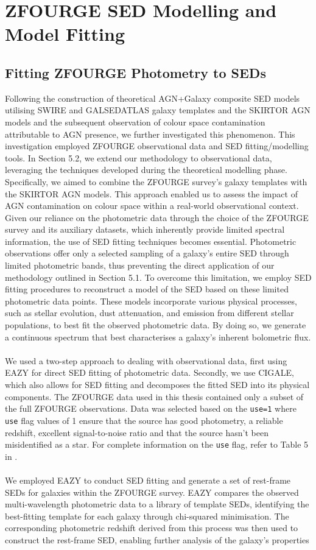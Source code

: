 \section{ZFOURGE SED Modelling and Model Fitting}
\subsection{Fitting ZFOURGE Photometry to SEDs}
Following the construction of theoretical AGN+Galaxy composite SED models utilising SWIRE and GALSEDATLAS galaxy templates and the SKIRTOR AGN models and the subsequent observation of colour space contamination attributable to AGN presence, we further investigated this phenomenon. This investigation employed ZFOURGE observational data and SED fitting/modelling tools. In Section 5.2, we extend our methodology to observational data, leveraging the techniques developed during the theoretical modelling phase. Specifically, we aimed to combine the ZFOURGE survey's galaxy templates with the SKIRTOR AGN models. This approach enabled us to assess the impact of AGN contamination on colour space within a real-world observational context. Given our reliance on the photometric data through the choice of the ZFOURGE survey and its auxiliary datasets, which inherently provide limited spectral information, the use of SED fitting techniques becomes essential.  Photometric observations offer only a selected sampling of a galaxy's entire SED through limited photometric bands, thus preventing the direct application of our methodology outlined in Section 5.1. To overcome this limitation, we employ SED fitting procedures to reconstruct a model of the SED based on these limited photometric data points. These models incorporate various physical processes, such as stellar evolution, dust attenuation, and emission from different stellar populations, to best fit the observed photometric data. By doing so, we generate a continuous spectrum that best characterises a galaxy's inherent bolometric flux.\\\\
We used a two-step approach to dealing with observational data, first using EAZY for direct SED fitting of photometric data. Secondly, we use CIGALE, which also allows for SED fitting and decomposes the fitted SED into its physical components. The ZFOURGE data used in this thesis contained only a subset of the full ZFOURGE observations. Data was selected based on the \texttt{use=1} where \texttt{use} flag values of 1 ensure that the source has good photometry, a reliable redshift, excellent signal-to-noise ratio and that the source hasn't been misidentified as a star. For complete information on the \texttt{use} flag, refer to Table 5 in \citet{straatman_fourstar_2016}. \\\\ We employed EAZY \citep{brammer_eazy_2008} to conduct SED fitting and generate a set of rest-frame SEDs for galaxies within the ZFOURGE survey. EAZY compares the observed multi-wavelength photometric data to a library of template SEDs, identifying the best-fitting template for each galaxy through chi-squared minimisation.  The corresponding photometric redshift derived from this process was then used to construct the rest-frame SED, enabling further analysis of the galaxy's properties
